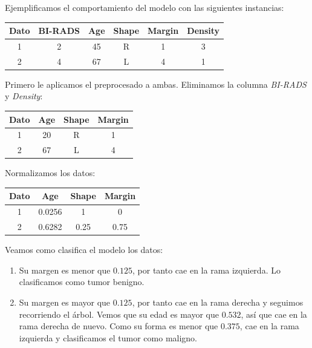 \documentclass[a4]{article}
\begin{document}
Ejemplificamos el comportamiento del modelo con las siguientes instancias:

\begin{center}
\begin{tabular}{|c|c|c|c|c|c|}
\hline
  \multicolumn{1}{|c|}{\textbf{Dato}} & \textbf{BI-RADS} & \textbf{Age} & \textbf{Shape} & \textbf{Margin} & \textbf{Density}\\ \hline
  1 & 2  & 45 & R & 1 & 3 \\ \hline
  2 & 4  & 67 & L & 4 & 1 \\ \hline
\end{tabular}
\end{center}

\vspace{5mm}

Primero le aplicamos el preprocesado a ambas. Eliminamos la columna \textit{BI-RADS} y \textit{Density}:

\begin{center}
\begin{tabular}{|c|c|c|c|}
\hline
  \multicolumn{1}{|c|}{\textbf{Dato}} & \textbf{Age} & \textbf{Shape} & \textbf{Margin}\\ \hline
  1 & 20 & R & 1 \\ \hline
  2 & 67 & L & 4 \\ \hline
\end{tabular}
\end{center}

Normalizamos los datos:

\begin{center}
\begin{tabular}{|c|c|c|c|}
\hline
  \multicolumn{1}{|c|}{\textbf{Dato}} & \textbf{Age} & \textbf{Shape} & \textbf{Margin}\\ \hline
  1 & 0.0256 & 1    & 0    \\ \hline
  2 & 0.6282 & 0.25 & 0.75 \\ \hline
\end{tabular}
\end{center}

Veamos como clasifica el modelo los datos:

\begin{enumerate}
\item Su margen es menor que $0.125$, por tanto cae en la rama izquierda. Lo clasificamos como tumor benigno.
\item Su margen es mayor que $0.125$, por tanto cae en la rama derecha y seguimos recorriendo el árbol. Vemos que su edad es mayor que $0.532$, así que cae en la rama derecha de nuevo. Como su forma es menor que $0.375$, cae en la rama izquierda y clasificamos el tumor como maligno.
\end{enumerate}
\end{document}
